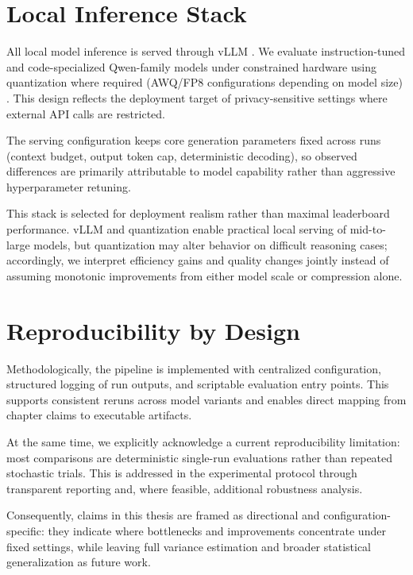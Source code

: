 \documentclass[a4paper,oneside,bibliography=totoc]{scrbook}
\begin{document}
\section{Local Inference Stack}

All local model inference is served through vLLM \cite{kwon2023vllm}. We evaluate instruction-tuned and code-specialized Qwen-family models under constrained hardware using quantization where required (AWQ/FP8 configurations depending on model size) \cite{lin2024awq}. This design reflects the deployment target of privacy-sensitive settings where external API calls are restricted.

The serving configuration keeps core generation parameters fixed across runs (context budget, output token cap, deterministic decoding), so observed differences are primarily attributable to model capability rather than aggressive hyperparameter retuning.

This stack is selected for deployment realism rather than maximal leaderboard performance. vLLM and quantization enable practical local serving of mid-to-large models, but quantization may alter behavior on difficult reasoning cases; accordingly, we interpret efficiency gains and quality changes jointly instead of assuming monotonic improvements from either model scale or compression alone.

\section{Reproducibility by Design}

Methodologically, the pipeline is implemented with centralized configuration, structured logging of run outputs, and scriptable evaluation entry points. This supports consistent reruns across model variants and enables direct mapping from chapter claims to executable artifacts.

At the same time, we explicitly acknowledge a current reproducibility limitation: most comparisons are deterministic single-run evaluations rather than repeated stochastic trials. This is addressed in the experimental protocol through transparent reporting and, where feasible, additional robustness analysis.

Consequently, claims in this thesis are framed as directional and configuration-specific: they indicate where bottlenecks and improvements concentrate under fixed settings, while leaving full variance estimation and broader statistical generalization as future work.
\end{document}

